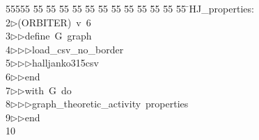 %
%
\begin{tabbing}
55555 \= 55 \= 55 \= 55 \= 55 \= 55 \= 55 \= 55 \= 55 \= 55 \= 55 \= 55 \= 55 \= \>HJ\_properties:\\[0pt]
2\>$\triangleright$\>(ORBITER)\ v\ 6\ \\[0pt]
3\>$\triangleright$\>$\triangleright$\>define\ G\ graph\ \\[0pt]
4\>$\triangleright$\>$\triangleright$\>$\triangleright$\>load\_csv\_no\_border\ \\[0pt]
5\>$\triangleright$\>$\triangleright$\>$\triangleright$\>halljanko315csv\ \\[0pt]
6\>$\triangleright$\>$\triangleright$\>end\ \\[0pt]
7\>$\triangleright$\>$\triangleright$\>with\ G\ do\ \\[0pt]
8\>$\triangleright$\>$\triangleright$\>$\triangleright$\>graph\_theoretic\_activity\ properties\ \\[0pt]
9\>$\triangleright$\>$\triangleright$\>end\\[0pt]
10\>\end{tabbing}
